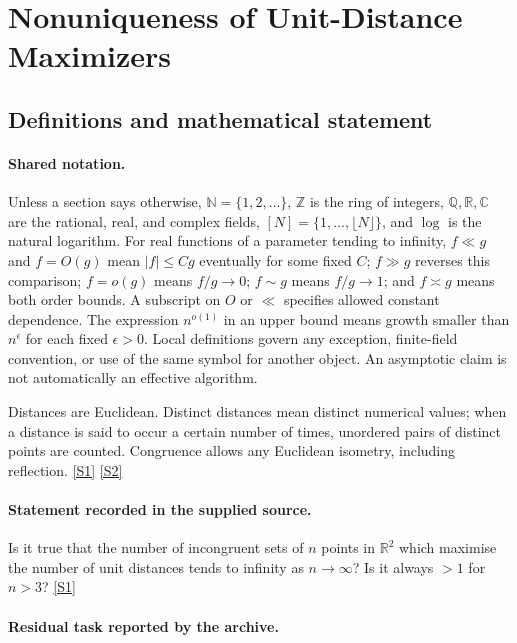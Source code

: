 \documentclass[11pt,a4paper]{article}
\newcommand{\N}{\mathbb{N}}
\newcommand{\Z}{\mathbb{Z}}
\newcommand{\Q}{\mathbb{Q}}
\newcommand{\R}{\mathbb{R}}
\newcommand{\C}{\mathbb{C}}
\newcommand{\sref}[2]{\hyperlink{source:#1:#2}{[S#2]}}
\begin{document}
\section{Nonuniqueness of Unit-Distance Maximizers}\label{statement}


\subsection{Definitions and mathematical statement}

\paragraph{Shared notation.}Unless a section says otherwise, $\N=\{1,2,\ldots\}$,
$\Z$ is the ring of integers, $\Q,\R,\C$ are the rational, real, and complex
fields, $[N]=\{1,\ldots,\lfloor N\rfloor\}$, and $\log$ is the natural
logarithm. For real functions of a parameter tending to infinity,
$f\ll g$ and $f=O(g)$ mean $|f|\leq Cg$ eventually for some fixed $C$;
$f\gg g$ reverses this comparison; $f=o(g)$ means $f/g\to0$;
$f\sim g$ means $f/g\to1$; and $f\asymp g$ means both order bounds.
A subscript on $O$ or $\ll$ specifies allowed constant dependence.
The expression $n^{o(1)}$ in an upper bound means growth smaller than
$n^\epsilon$ for each fixed $\epsilon>0$. Local definitions govern any
exception, finite-field convention, or use of the same symbol for another
object. An asymptotic claim is not automatically an effective algorithm.



Distances are Euclidean. Distinct distances mean distinct numerical values; when a distance is said to occur a certain number of times, unordered pairs of distinct points are counted. Congruence allows any Euclidean isometry, including reflection. \sref{statement}{1} \sref{statement}{2}

\paragraph{Statement recorded in the supplied source.}
Is it true that the number of incongruent sets of $n$ points in $\mathbb{R}^2$ which maximise the number of unit distances tends to infinity as $n\to\infty$? Is it always $>1$ for $n>3$? \sref{statement}{1}

\paragraph{Residual task reported by the archive.}
\end{document}

